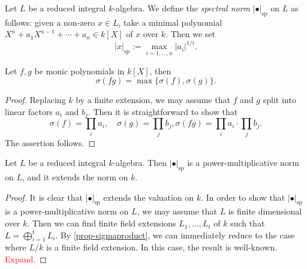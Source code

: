 \begin{definition}
    Let $L$ be a reduced integral $k$-algebra. We define the \emph{spectral norm} $|\bullet|_{\mathrm{sp}}$ on $L$ as follows: given a non-zero $x\in L$, take a minimal polynomial $X^n+a_1X^{n-1}+\cdots+a_n\in k[X]$ of $x$ over $k$. Then we set
    \[
      |x|_{\mathrm{sp}}:=\max_{i=1,\ldots,n} |a_i|^{1/i}.  
    \]
\end{definition}



\begin{proposition}\label{prop-sigmaproduct}
    Let $f,g$ be monic polynomials in $k[X]$, then
    \[
        \sigma(fg)=\max\{\sigma(f),\sigma(g)\}.    
    \]
\end{proposition}
\begin{proof}
     Replacing $k$ by a finite extension, we may assume that $f$ and $g$ split into linear factors $a_i$ and $b_j$. Then it is straightforward to show that
     \[
       \sigma(f)=\prod_i a_i,\quad \sigma(g)=\prod_j b_j, \sigma(fg)= \prod_i a_i \cdot \prod_j b_j.
     \]
     The assertion follows.
\end{proof}


\begin{proposition}
    Let $L$ be a reduced integral $k$-algebra. Then $|\bullet|_{\mathrm{sp}}$ is a power-multiplicative norm on $L$, and it extends the norm on $k$.
\end{proposition}
\begin{proof}
    It is clear that $|\bullet|_{\mathrm{sp}}$ extends the valuation on $k$. In order to show that $|\bullet|_{\mathrm{sp}}$ is a power-multiplicative norm on $L$, we may assume that $L$ is finite dimensional over $k$. Then we can find finite field extensions $L_1,\ldots,L_t$ of $k$ such that $L=\bigoplus_{i=1}^t L_i$. By \cref{prop-sigmaproduct}, we can immediately reduce to the case where $L/k$ is a finite field extension. In this case, the result is well-known. \textcolor{red}{Expand.}
\end{proof} 

